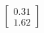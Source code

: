 \documentclass[preview]{standalone}
\begin{document}
\begin{align*}
\begin{bmatrix} 0.31 \\ 1.62 \end{bmatrix}
\end{align*}
\end{document}

